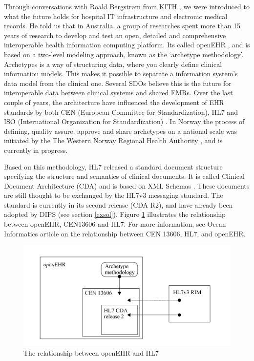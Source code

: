 Through conversations with Roald Bergstrøm from KITH \cite{KITH}, we were introduced to what the future holds for hospital IT infrastructure and electronic medical records. He told us that in Australia, a group of researches spent more than 15 years of research to develop and test an open, detailed and comprehensive interoperable health information computing platform. Its called openEHR \cite{openEHR}, and is based on a two-level modeling approach, known as the ‘archetype methodology’. Archetypes is a way of structuring data, where you clearly define clinical information models. This makes it possible to separate a information system's data model from the clinical one. Several SDOs believe this is the future for interoperable data between clinical systems and shared EMRs. Over the last couple of years, the architecture have influenced the development of EHR standards by both CEN (European Committee for Standardization), HL7 and ISO (International Organization for Standardization) \cite{rel:openehr}. In Norway the process of defining, quality assure, approve and share archetypes on a national scale was initiated by the The Western Norway Regional Health Authority \cite{helseVest}, and is currently in progress.

Based on this methodology, HL7 released a standard document structure specifying the structure and semantics of clinical documents. It is called Clinical Document Architecture (CDA) and is based on XML Schemas \cite{hl7CDAR2}. These documents are still thought to be exchanged by the HL7v3 messaging standard. The standard is currently in its second release (CDA R2), and have already been adopted by DIPS (see section \ref{exsol}). Figure \ref{fig:HL7relationship} illustrates the relationship between openEHR, CEN13606 and HL7. For more information, see Ocean Informatics article on the relationship between CEN 13606, HL7, and openEHR\cite{rel_openehr1}.

\begin{figure}[H]
\centering
\includegraphics[scale=0.8]{img/relationship.png}
\caption{The relationship between openEHR and HL7\cite{rel_openehr1}}
\label{fig:HL7relationship}
\end{figure}



